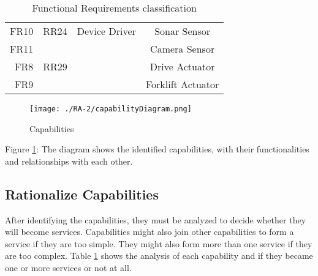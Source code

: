 \begin{table}
\begin{tabular}{| r | p{1.8cm} | c | c |}
		\hline
		FR10 & RR24 & Device Driver & Sonar Sensor\\
		FR11 & 		& 				& Camera Sensor\\
		FR8 & RR29 	& & Drive Actuator\\
		FR9 & 		& & Forklift Actuator\\
	 	\hline
	\end{tabular}
	\caption{Functional Requirements classification}
	\label{tab:fr_classification}
\end{table}


\begin{figure}[ht!]
 \centering
 \texttt{[image: ./RA-2/capabilityDiagram.png]}
 \caption{Capabilities}
 \label{fig:capabilities}
\end{figure}

Figure \ref{fig:capabilities}: The diagram shows the identified capabilities, with their functionalities and relationships with each other.

\subsection{Rationalize Capabilities}
After identifying the capabilities, they must be analyzed to decide whether they will become services. Capabilities might also join other capabilities to form a service if they are too simple. They might also form more than one service if they are too complex. Table \ref{tab:fr_classification} shows the analysis of each capability and if they became one or more services or not at all. 

